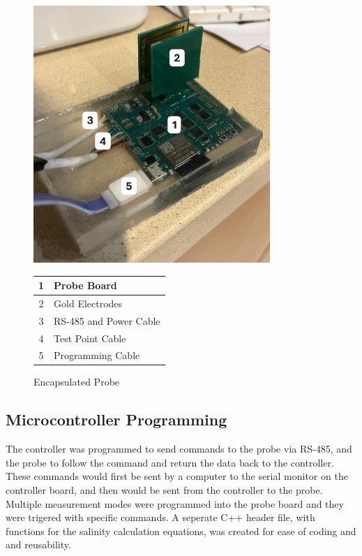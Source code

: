 \begin{figure}[H]
    \begin{minipage}{0.5\textwidth}
        \centering
        \includegraphics[width=0.8\textwidth]{Figures/encapsulated_probe.jpg}
    \end{minipage}
    \begin{minipage}{0.5\textwidth}
        \centering
        \begin{tabular}{cl} \hline
            1 & Probe Board \\ \hline
            2 & Gold Electrodes \\ \hline
            3 & RS-485 and Power Cable \\ \hline
            4 & Test Point Cable \\ \hline
            5 & Programming Cable \\ \hline
        \end{tabular}
    \end{minipage}
    \caption{Encapsulated Probe}
    \label{fig:encapsulated_probe} %
\end{figure}

\subsection{Microcontroller Programming}
The controller was programmed to send commands to the probe via RS-485, and the probe to follow the command and return the data back to the controller.
These commands would first be sent by a computer to the serial monitor on the controller board, and then would be sent from the controller to the probe.
Multiple measurement modes were programmed into the probe board and they were trigered with specific commands.
A seperate C++ header file, with functions for the salinity calculation equations, was created for ease of coding and and reusability.

